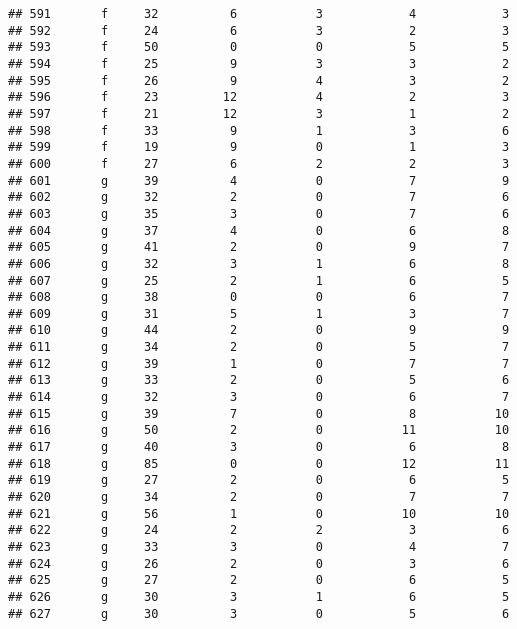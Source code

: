 \documentclass[
]{article}
\begin{document}
\begin{verbatim}
## 591       f     32          6           3            4            3
## 592       f     24          6           3            2            3
## 593       f     50          0           0            5            5
## 594       f     25          9           3            3            2
## 595       f     26          9           4            3            2
## 596       f     23         12           4            2            3
## 597       f     21         12           3            1            2
## 598       f     33          9           1            3            6
## 599       f     19          9           0            1            3
## 600       f     27          6           2            2            3
## 601       g     39          4           0            7            9
## 602       g     32          2           0            7            6
## 603       g     35          3           0            7            6
## 604       g     37          4           0            6            8
## 605       g     41          2           0            9            7
## 606       g     32          3           1            6            8
## 607       g     25          2           1            6            5
## 608       g     38          0           0            6            7
## 609       g     31          5           1            3            7
## 610       g     44          2           0            9            9
## 611       g     34          2           0            5            7
## 612       g     39          1           0            7            7
## 613       g     33          2           0            5            6
## 614       g     32          3           0            6            7
## 615       g     39          7           0            8           10
## 616       g     50          2           0           11           10
## 617       g     40          3           0            6            8
## 618       g     85          0           0           12           11
## 619       g     27          2           0            6            5
## 620       g     34          2           0            7            7
## 621       g     56          1           0           10           10
## 622       g     24          2           2            3            6
## 623       g     33          3           0            4            7
## 624       g     26          2           0            3            6
## 625       g     27          2           0            6            5
## 626       g     30          3           1            6            5
## 627       g     30          3           0            5            6

\end{verbatim}
\end{document}
